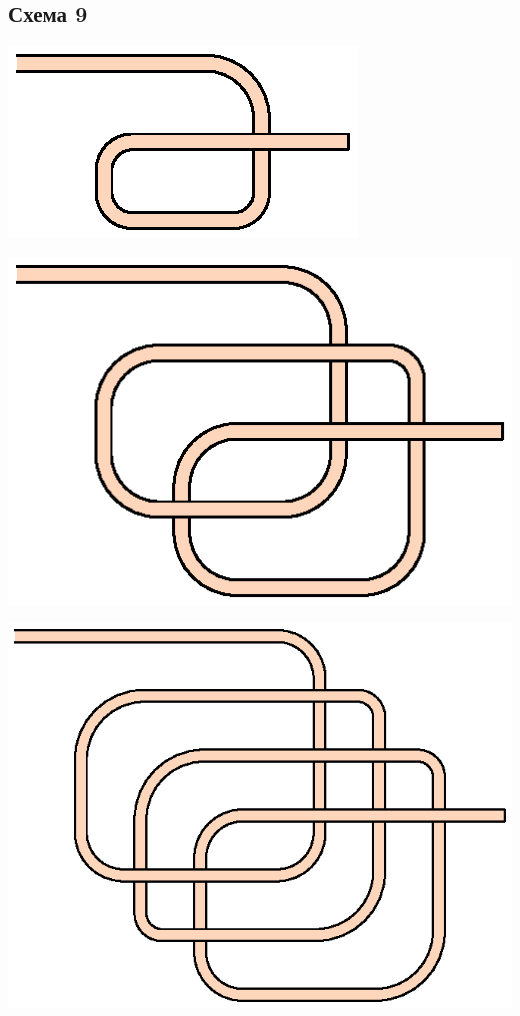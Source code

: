 \subsection{Схема 9}
\graphicspath{{\currentpath}}

\includegraphics{images/s-09-a1.eps}

\includegraphics{images/s-09-a2.eps}

\includegraphics{images/s-09-a3.eps}

